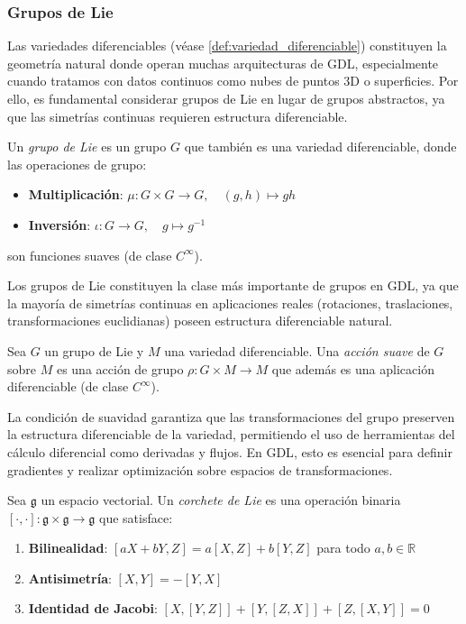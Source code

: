 \subsubsection{Grupos de Lie}

Las variedades diferenciables (véase \autoref{def:variedad_diferenciable}) constituyen la geometría natural donde operan muchas arquitecturas de \gls{GDL}, especialmente cuando tratamos con datos continuos como nubes de puntos 3D o superficies. Por ello, es fundamental considerar grupos de Lie en lugar de grupos abstractos, ya que las simetrías continuas requieren estructura diferenciable.

\begin{definition}\label{def:grupo_lie}
Un \textit{grupo de Lie} es un grupo $G$ que también es una variedad diferenciable, donde las operaciones de grupo:
\begin{itemize}
    \item \textbf{Multiplicación}: $\mu: G \times G \rightarrow G, \quad (g,h) \mapsto gh$
    \item \textbf{Inversión}: $\iota: G \rightarrow G, \quad g \mapsto g^{-1}$
\end{itemize}
son funciones suaves (de clase $C^\infty$).
\end{definition}

Los grupos de Lie constituyen la clase más importante de grupos en \gls{GDL}, ya que la mayoría de simetrías continuas en aplicaciones reales (rotaciones, traslaciones, transformaciones euclidianas) poseen estructura diferenciable natural.

\begin{definition}\label{def:accion_suave}
Sea $G$ un grupo de Lie y $M$ una variedad diferenciable. Una \textit{acción suave} de $G$ sobre $M$ es una acción de grupo $\rho: G \times M \rightarrow M$ que además es una aplicación diferenciable (de clase $C^\infty$).
\end{definition}

La condición de suavidad garantiza que las transformaciones del grupo preserven la estructura diferenciable de la variedad, permitiendo el uso de herramientas del cálculo diferencial como derivadas y flujos. En \gls{GDL}, esto es esencial para definir gradientes y realizar optimización sobre espacios de transformaciones.

\begin{definition}\label{def:corchete_lie}
Sea $\mathfrak{g}$ un espacio vectorial. Un \textit{corchete de Lie} es una operación binaria $[\cdot, \cdot]: \mathfrak{g} \times \mathfrak{g} \rightarrow \mathfrak{g}$ que satisface:
\begin{enumerate}
    \item \textbf{Bilinealidad}: $[aX + bY, Z] = a[X,Z] + b[Y,Z]$ para todo $a, b \in \mathbb{R}$
    \item \textbf{Antisimetría}: $[X,Y] = -[Y,X]$
    \item \textbf{Identidad de Jacobi}: $[X,[Y,Z]] + [Y,[Z,X]] + [Z,[X,Y]] = 0$
\end{enumerate}
\end{definition}

